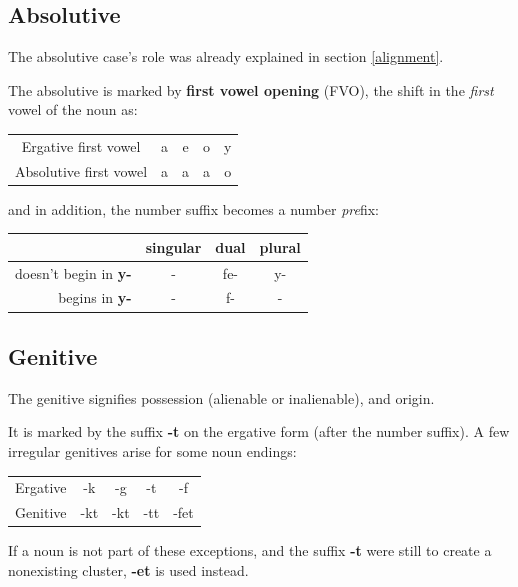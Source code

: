 \documentclass[10pt,oneside]{memoir}
\begin{document}
\begin{multicols}{2}
\begin{center}
\begin{tabular}[]{c |c}
\end{tabular}
\end{center}


\subsection{Absolutive}

The absolutive case's role was already explained in section \ref{alignment}.

The absolutive is marked by \textbf{first vowel opening} (FVO), the shift in the \emph{first} vowel of the noun as:

\begin{tabular}{c | c c c c}
	Ergative first vowel & a  &e  &o & y\\
	Absolutive first vowel & a & a & a & o
\end{tabular}

and in addition, the number suffix becomes a number \emph{pre}fix:

\begin{center}
    \begin{tabular}[]{r c c c}
        & singular & dual & plural\\
        \hline
        doesn't begin in \textbf{y-}  &  -       & fe-   & y-\\
        begins in \textbf{y-} & - & f- & -
    \end{tabular}
\end{center}

\subsection{Genitive}

The genitive signifies possession (alienable or inalienable), and origin.

It is marked by the suffix \textbf{-t} on the ergative form (after the number suffix). A few irregular genitives arise for some noun endings:

\begin{center}
\begin{tabular}{c || c | c | c | c}
Ergative & -k & -g & -t & -f\\
Genitive & -kt & -kt & -tt & -fet
\end{tabular}
\end{center}



If a noun is not part of these exceptions, and the suffix \textbf{-t} were still to create a nonexisting cluster, \textbf{-et} is used instead.


\end{multicols}
\end{document}
